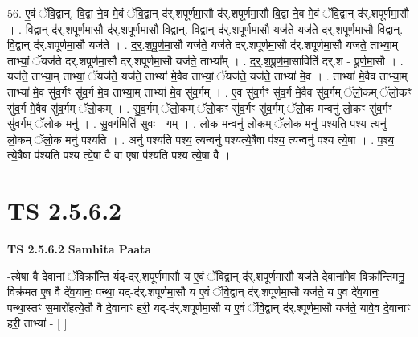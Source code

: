 \documentclass[17pt]{extarticle}
\begin{document}
56. ए॒वं ॅवि॒द्वान्. वि॒द्वा ने॒व मे॒वं ॅवि॒द्वान् द॑र्.शपूर्णमा॒सौ द॑र्.शपूर्णमा॒सौ वि॒द्वा ने॒व मे॒वं ॅवि॒द्वान् द॑र्.शपूर्णमा॒सौ । . वि॒द्वान् द॑र्.शपूर्णमा॒सौ द॑र्.शपूर्णमा॒सौ वि॒द्वान्. वि॒द्वान् द॑र्.शपूर्णमा॒सौ यज॑ते॒ यज॑ते दर्.शपूर्णमा॒सौ वि॒द्वान्. वि॒द्वान् द॑र्.शपूर्णमा॒सौ यज॑ते । . द॒र्॒.श॒पू॒र्ण॒मा॒सौ यज॑ते॒ यज॑ते दर्.शपूर्णमा॒सौ द॑र्.शपूर्णमा॒सौ यज॑ते॒ ताभ्या॒म् ताभ्यां॒ ॅयज॑ते दर्.शपूर्णमा॒सौ द॑र्.शपूर्णमा॒सौ यज॑ते॒ ताभ्या᳚म् । . द॒र्॒.श॒पू॒र्ण॒मा॒साविति॑ दर्.श - पू॒र्ण॒मा॒सौ । . यज॑ते॒ ताभ्या॒म् ताभ्यां॒ ॅयज॑ते॒ यज॑ते॒ ताभ्या॑ मे॒वैव ताभ्यां॒ ॅयज॑ते॒ यज॑ते॒ ताभ्या॑ मे॒व । . ताभ्या॑ मे॒वैव ताभ्या॒म् ताभ्या॑ मे॒व सु॑व॒र्गꣳ सु॑व॒र्ग मे॒व ताभ्या॒म् ताभ्या॑ मे॒व सु॑व॒र्गम् । . ए॒व सु॑व॒र्गꣳ सु॑व॒र्ग मे॒वैव सु॑व॒र्गम् ॅलो॒कम् ॅलो॒कꣳ सु॑व॒र्ग मे॒वैव सु॑व॒र्गम् ॅलो॒कम् । . सु॒व॒र्गम् ॅलो॒कम् ॅलो॒कꣳ सु॑व॒र्गꣳ सु॑व॒र्गम् ॅलो॒क मन्वनु॑ लो॒कꣳ सु॑व॒र्गꣳ सु॑व॒र्गम् ॅलो॒क मनु॑ । . सु॒व॒र्गमिति॑ सुवः - गम् । . लो॒क मन्वनु॑ लो॒कम् ॅलो॒क मनु॑ पश्यति पश्य॒ त्यनु॑ लो॒कम् ॅलो॒क मनु॑ पश्यति । . अनु॑ पश्यति पश्य॒ त्यन्वनु॑ पश्यत्ये॒षैषा प॑श्य॒ त्यन्वनु॑ पश्य त्ये॒षा । . प॒श्य॒ त्ये॒षैषा प॑श्यति पश्य त्ये॒षा वै वा ए॒षा प॑श्यति पश्य त्ये॒षा वै । \newline
\pagebreak
{}
\section*{ TS 2.5.6.2 }

\textbf{TS 2.5.6.2 } \newline
\textbf{Samhita Paata} \newline

-त्ये॒षा वै दे॒वानां॒ ॅविक्रा᳚न्ति॒ र्यद्-द॑र्.शपूर्णमा॒सौ य ए॒वं ॅवि॒द्वान् द॑र्.शपूर्णमा॒सौ यज॑ते दे॒वाना॑मे॒व विक्रा᳚न्ति॒मनु॒ विक्र॑मत ए॒ष वै दे॑व॒यानः॒ पन्था॒ यद्-द॑र्.शपूर्णमा॒सौ य ए॒वं ॅवि॒द्वान् द॑र्.शपूर्णमा॒सौ यज॑ते॒ य ए॒व दे॑व॒यानः॒ पन्था॒स्तꣳ स॒मारो॑हत्ये॒तौ वै दे॒वानाꣳ॒॒ हरी॒ यद्-द॑र्.शपूर्णमा॒सौ य ए॒वं ॅवि॒द्वान् द॑र्.श्पूर्णमा॒सौ यज॑ते॒ यावे॒व दे॒वानाꣳ॒॒ हरी॒ ताभ्या॑ - [  ] \newline
\end{document}
